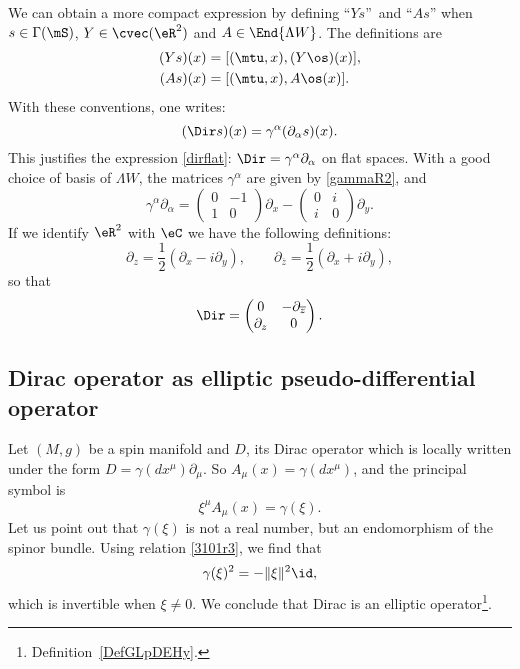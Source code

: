 We can obtain a more compact expression by defining ``$Ys$''\ and ``$As$'' when $s\in\Gamma(\mS)$, $Y\in\cvec(\eR^2)$ and $A\in\End{\Lambda W }$. The definitions are
\begin{align*}
	(Ys)(x) & =[(\mtu,x),(Y\os)(x)], \\
	(As)(x) & =[(\mtu,x),A\os(x)].
\end{align*}
With these conventions, one writes:
\[
	(\Dir s)(x)=\gamma^{\alpha}(\partial_{\alpha} s)(x).
\]
This justifies the expression \eqref{dirflat}: $\Dir=\gamma^{\alpha}\partial_{\alpha}$ on flat spaces. With a good choice of basis of $\Lambda W $, the matrices $\gamma^{\alpha}$ are given by \eqref{gammaR2}, and
\[
	\gamma^{\alpha}\partial_{\alpha}=
	\begin{pmatrix}
		0 & -1 \\
		1 & 0
	\end{pmatrix}\partial_x-
	\begin{pmatrix}
		0 & i \\
		i & 0
	\end{pmatrix}\partial_y.
\]
If we identify $\eR^2$ with $\eC$ we have the following definitions:
\[
	\partial_z=\frac{1}{2}(\partial_x-i\partial_y),\qquad\partial_{\overline{z}}=\frac{1}{2}(\partial_x+i\partial_y),\]
so that
\[\Dir=\begin{pmatrix}
		0          & -\partial_{\overline{z}} \\
		\partial_z & 0
	\end{pmatrix}.
\]

\subsection{Dirac operator as elliptic pseudo-differential operator}
\label{subSecREctBOh}

Let $(M,g)$ be a spin manifold and $D$, its Dirac operator which is locally written under the form $D=\gamma(dx^{\mu})\partial_{\mu}$. So $A_{\mu}(x)=\gamma(dx^{\mu})$, and the principal symbol is
\[
	\xi^{\mu}A_{\mu}(x)=\gamma(\xi).
\]
Let us point out that $\gamma(\xi)$ is not a real number, but an endomorphism of the spinor bundle. Using relation \eqref{3101r3}, we find that
\[
	\gamma(\xi)^2=-\| \xi \|^2\id,
\]
which is invertible when $\xi\neq 0$. We conclude that Dirac is an elliptic operator\footnote{Definition~\ref{DefGLpDEHy}.}.


